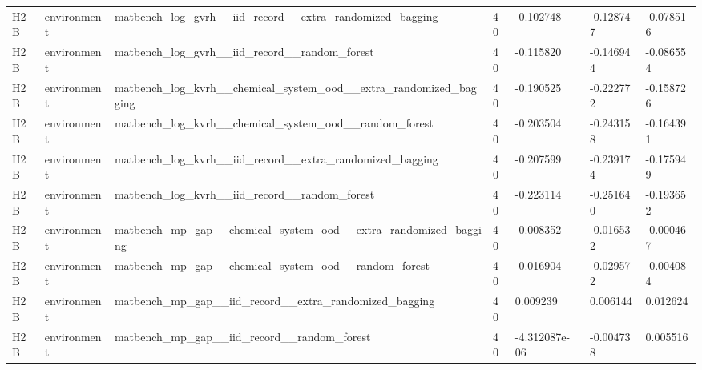 \documentclass[10pt]{article}
\begin{document}
\begin{landscape}
\begin{longtable}{L{.35in}L{.6in}L{3.55in}L{.4in}L{.88in}L{.88in}L{.88in}}
H2B & environment & matbench\_\allowbreak{}log\_\allowbreak{}gvrh\_\allowbreak{}\_\allowbreak{}iid\_\allowbreak{}record\_\allowbreak{}\_\allowbreak{}extra\_\allowbreak{}randomized\_\allowbreak{}bagging & 40 & -0.102748 & -0.128747 & -0.078516\\
H2B & environment & matbench\_\allowbreak{}log\_\allowbreak{}gvrh\_\allowbreak{}\_\allowbreak{}iid\_\allowbreak{}record\_\allowbreak{}\_\allowbreak{}random\_\allowbreak{}forest & 40 & -0.115820 & -0.146944 & -0.086554\\
H2B & environment & matbench\_\allowbreak{}log\_\allowbreak{}kvrh\_\allowbreak{}\_\allowbreak{}chemical\_\allowbreak{}system\_\allowbreak{}ood\_\allowbreak{}\_\allowbreak{}extra\_\allowbreak{}randomized\_\allowbreak{}bagging & 40 & -0.190525 & -0.222772 & -0.158726\\
H2B & environment & matbench\_\allowbreak{}log\_\allowbreak{}kvrh\_\allowbreak{}\_\allowbreak{}chemical\_\allowbreak{}system\_\allowbreak{}ood\_\allowbreak{}\_\allowbreak{}random\_\allowbreak{}forest & 40 & -0.203504 & -0.243158 & -0.164391\\
H2B & environment & matbench\_\allowbreak{}log\_\allowbreak{}kvrh\_\allowbreak{}\_\allowbreak{}iid\_\allowbreak{}record\_\allowbreak{}\_\allowbreak{}extra\_\allowbreak{}randomized\_\allowbreak{}bagging & 40 & -0.207599 & -0.239174 & -0.175949\\
H2B & environment & matbench\_\allowbreak{}log\_\allowbreak{}kvrh\_\allowbreak{}\_\allowbreak{}iid\_\allowbreak{}record\_\allowbreak{}\_\allowbreak{}random\_\allowbreak{}forest & 40 & -0.223114 & -0.251640 & -0.193652\\
H2B & environment & matbench\_\allowbreak{}mp\_\allowbreak{}gap\_\allowbreak{}\_\allowbreak{}chemical\_\allowbreak{}system\_\allowbreak{}ood\_\allowbreak{}\_\allowbreak{}extra\_\allowbreak{}randomized\_\allowbreak{}bagging & 40 & -0.008352 & -0.016532 & -0.000467\\
H2B & environment & matbench\_\allowbreak{}mp\_\allowbreak{}gap\_\allowbreak{}\_\allowbreak{}chemical\_\allowbreak{}system\_\allowbreak{}ood\_\allowbreak{}\_\allowbreak{}random\_\allowbreak{}forest & 40 & -0.016904 & -0.029572 & -0.004084\\
H2B & environment & matbench\_\allowbreak{}mp\_\allowbreak{}gap\_\allowbreak{}\_\allowbreak{}iid\_\allowbreak{}record\_\allowbreak{}\_\allowbreak{}extra\_\allowbreak{}randomized\_\allowbreak{}bagging & 40 & 0.009239 & 0.006144 & 0.012624\\
H2B & environment & matbench\_\allowbreak{}mp\_\allowbreak{}gap\_\allowbreak{}\_\allowbreak{}iid\_\allowbreak{}record\_\allowbreak{}\_\allowbreak{}random\_\allowbreak{}forest & 40 & -4.312087e-06 & -0.004738 & 0.005516\\

\end{longtable}
\end{landscape}
\end{document}

